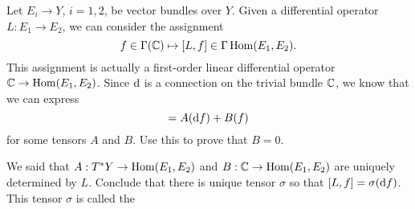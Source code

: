 \documentclass{amsart}
\begin{document}
\begin{defn}
  Let $E_{i}\to Y$, $i=1,2$, be vector bundles over $Y$. Given a differential operator $L:E_{1}\to E_{2}$, we can consider the assignment
  \begin{equation*}
    f\in \Gamma(\mathbb{C})\mapsto [L,f]\in \Gamma\operatorname{\mathrm{Hom}}(E_{1},E_{2}).
  \end{equation*}
  This assignment is actually a first-order linear differential operator $\mathbb{C}\to \operatorname{\mathrm{Hom}}(E_{1},E_{2})$. Since $\mathrm{d}$ is a connection on the trivial bundle $\mathbb{C}$, we know that we can express
    \begin{equation*}
      [L,f]=A(\d f)+B(f)
    \end{equation*}
    for some tensors $A$ and $B$. Use this to prove that $B=0$.

    We said that $A:T^{*}Y\to \operatorname{\mathrm{Hom}}(E_{1},E_{2})$ and $B:\mathbb{C}\to \operatorname{\mathrm{Hom}}(E_{1},E_{2})$ are uniquely determined by $L$. Conclude that there is unique tensor $\sigma$ so that $[L,f]=\sigma(\mathrm{d} f)$. This tensor $\sigma$ is called the \textbf{}
\end{defn}
\end{document}
